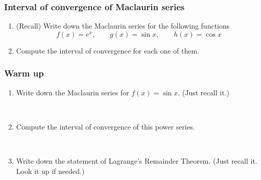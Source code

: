 \documentclass[14pt]{beamer}
\begin{document}
	\begin{frame}[t]
		\frametitle{Interval of convergence of Maclaurin series}

		\begin{enumerate}
			\item (Recall) Write down the Maclaurin series for the following functions
				\[
					f(x) = e^{x}, \quad \quad g(x) = \sin x, \quad \quad h(x) = \cos x
				\]

			\item Compute the interval of convergence for each one of them.
		\end{enumerate}
	\end{frame}
	\begin{frame}[t]
		\frametitle{Warm up}

		\begin{enumerate}
			\item Write down the Maclaurin series for ${\displaystyle f(x)=\sin x}$. (Just
				recall it.)

				\


			\item Compute the interval of convergence of this power series.

				\

			\item Write down the statement of Lagrange's Remainder Theorem. (Just recall
				it. Look it up if needed.)
		\end{enumerate}
	\end{frame}
\end{document}
